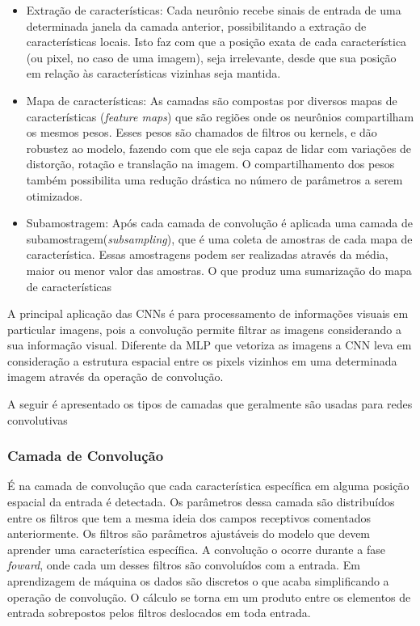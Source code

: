\begin{itemize}
	\item Extração de características: Cada neurônio recebe sinais de entrada de uma determinada janela da camada anterior, possibilitando a extração de características locais. Isto faz com que a posição exata de cada característica (ou pixel, no caso de uma imagem), seja irrelevante, desde que sua posição em relação às características vizinhas seja mantida.
	\item Mapa de características: As camadas são compostas por diversos mapas de características (\textit{feature maps}) que são regiões onde os neurônios compartilham os mesmos pesos. Esses pesos são chamados de filtros ou kernels, e dão robustez ao modelo, fazendo com que ele seja capaz de lidar com variações de distorção, rotação e translação na imagem. O compartilhamento dos pesos também possibilita uma redução drástica no número de parâmetros a serem otimizados.
	\item Subamostragem: Após cada camada de convolução é aplicada uma camada de subamostragem(\textit{subsampling}), que é uma coleta de amostras de cada mapa de característica. Essas amostragens podem ser realizadas através da média, maior ou menor valor das amostras. O que produz uma sumarização do mapa de características
\end{itemize}

A principal aplicação das CNNs é para processamento de informações visuais em particular imagens, pois a convolução permite filtrar as imagens considerando a sua informação visual. Diferente da MLP que vetoriza as imagens a CNN leva em consideração a estrutura espacial entre os pixels vizinhos em uma determinada imagem através da operação de convolução.

A seguir é apresentado os tipos de camadas que geralmente são usadas para redes convolutivas

\subsubsection{Camada de Convolução}
É na camada de convolução que cada característica específica em alguma posição espacial da entrada é detectada. Os parâmetros dessa camada são distribuídos entre os filtros que tem a mesma ideia dos campos receptivos comentados anteriormente. Os filtros são parâmetros ajustáveis do modelo que devem aprender uma característica específica.  A convolução o ocorre durante a fase \textit{foward}, onde cada um desses filtros são convoluídos com a entrada. Em aprendizagem de máquina os dados são discretos o que acaba simplificando a operação de convolução. O cálculo se torna em um produto entre os elementos de entrada sobrepostos pelos filtros deslocados em toda entrada. 

